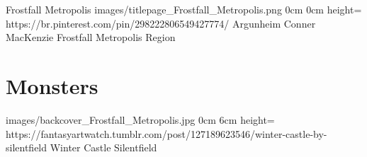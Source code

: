 \documentclass[letterpaper,openany,twoside,twocolumn]{book}
\begin{document}
	\regionTitlePage
		{Frostfall Metropolis}
		{images/titlepage_Frostfall_Metropolis.png}
		{0cm}
		{0cm}
		{height=\paperheight}
		{https://br.pinterest.com/pin/298222806549427774/}
		{Argunheim}
		{Conner MacKenzie}
		{Frostfall Metropolis Region}
	
	\tableofcontents
	
	\mainmatter
	
	\MonsterSheetGeometry
	\part{Monsters}
	
	
	\bookLastPage
		{images/backcover_Frostfall_Metropolis.jpg}
		{0cm}
		{6cm}
		{height=\paperheight}
		{https://fantasyartwatch.tumblr.com/post/127189623546/winter-castle-by-silentfield}
		{Winter Castle}
		{Silentfield}
		{}
\end{document}
